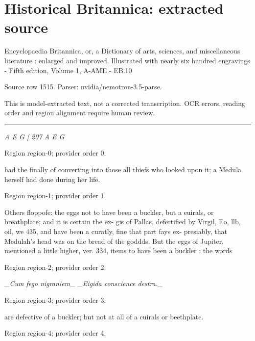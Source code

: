 \documentclass[11pt]{article}
\begin{document}
\section*{Historical Britannica: extracted source}
Encyclopaedia Britannica, or, a Dictionary of arts, sciences, and miscellaneous literature : enlarged and improved. Illustrated with nearly six hundred engravings - Fifth edition, Volume 1, A-AME - EB.10\par
{\small Source row 1515. Parser: nvidia/nemotron-3.5-parse.\par}
{\small This is model-extracted text, not a corrected transcription. OCR errors, reading order and region alignment require human review.\par}
\hrule\medskip
{\small\itshape A E G [ 207 A E G\par}

{\scriptsize\color{gray} Region region-0; provider order 0.\par}
\medskip

had the finally of converting into those all thiefs who looked upon it; a Medula herself had done during her life.
\par

{\scriptsize\color{gray} Region region-1; provider order 1.\par}
\medskip

Others floppofe: the eggs not to have been a buckler, but a euirals, or breathplate; and it is certain the ex- gis of Pallas, defertified by Virgil, Eo, llb, oil, we 435, and have been a curatly, fine that part fays ex- presiably, that Medulah's head was on the bread of the goddds. But the eggs of Jupiter, mentioned a little higher, ver. 334, items to have been a buckler : the words
\par

{\scriptsize\color{gray} Region region-2; provider order 2.\par}
\medskip

{\small\itshape \_Cum fego nigraniem\_ \_Eigida conscience destra.\_\par}

{\scriptsize\color{gray} Region region-3; provider order 3.\par}
\medskip

are defective of a buckler; but not at all of a cuirals or beethplate.
\par

{\scriptsize\color{gray} Region region-4; provider order 4.\par}
\medskip
\end{document}
